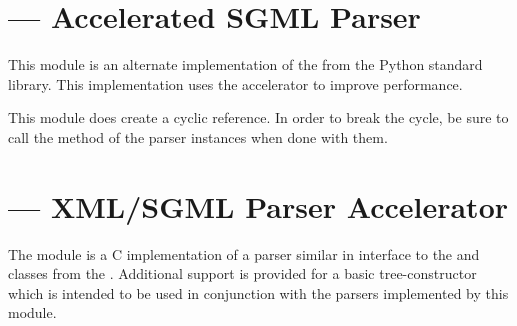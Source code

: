 \documentclass{howto}
\begin{document}
\begin{seealso}
\end{seealso}


\section{ ---
         Accelerated SGML Parser}


This module is an alternate implementation of the
from the Python standard library.  This implementation uses the
 accelerator to improve performance.

This module does create a cyclic reference.  In order to break the
cycle, be sure to call the  method of the parser
instances when done with them.


\section{ ---
         XML/SGML Parser Accelerator}


The  module is a C implementation of a
parser similar in interface to the  and
 classes from the .  Additional
support is provided for a basic tree-constructor which is intended to
be used in conjunction with the parsers implemented by this module.



\end{document}
